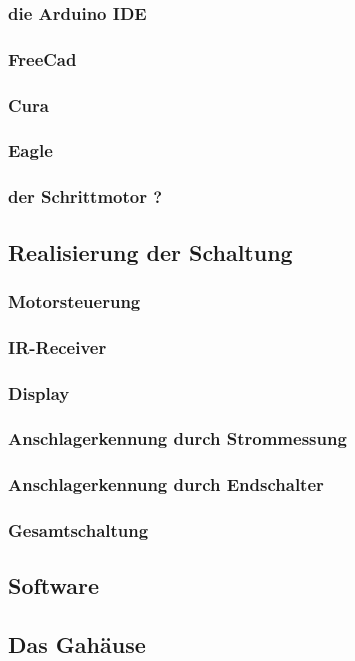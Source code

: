 \documentclass[a4paper, twoside, 10pt]{article}
\begin{document}
			\subsubsection{die Arduino IDE}
			\subsubsection{FreeCad}
			\subsubsection{Cura}
			\subsubsection{Eagle}
			\subsubsection{der Schrittmotor ?}
		\subsection{Realisierung der Schaltung}
			\subsubsection{Motorsteuerung}
			\subsubsection{IR-Receiver}
			\subsubsection{Display}
			\subsubsection{Anschlagerkennung durch Strommessung}
			\subsubsection{Anschlagerkennung durch Endschalter}
			\subsubsection{Gesamtschaltung}
		\subsection{Software}
		\subsection{Das Gahäuse}
\end{document}
